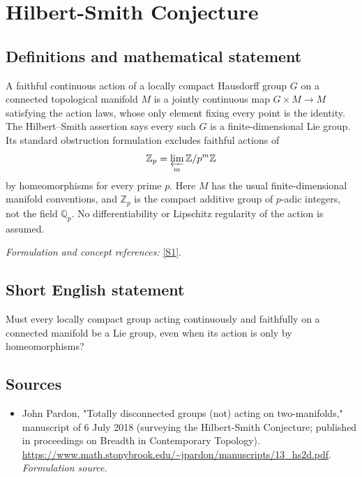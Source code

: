 \documentclass[11pt]{article}
\begin{document}
\section*{\texorpdfstring{Hilbert-Smith Conjecture}{Hilbert-Smith Conjecture}}\label{207}
\subsection{Definitions and mathematical statement}
A faithful continuous action of a locally compact Hausdorff group $G$ on a connected topological manifold $M$ is a jointly continuous map $G\times M\to M$ satisfying the action laws, whose only element fixing every point is the identity. The Hilbert--Smith assertion says every such $G$ is a finite-dimensional Lie group. Its standard obstruction formulation excludes faithful actions of
\[
 {\mathbb{Z}}_p=\varprojlim_m{\mathbb{Z}}/p^m{\mathbb{Z}}
\]
by homeomorphisms for every prime $p$. Here $M$ has the usual finite-dimensional manifold conventions, and ${\mathbb{Z}}_p$ is the compact additive group of $p$-adic integers, not the field ${\mathbb{Q}}_p$. No differentiability or Lipschitz regularity of the action is assumed.
\par\smallskip\textit{Formulation and concept references:} \href{https://www.math.stonybrook.edu/~jpardon/manuscripts/13_hs2d.pdf}{[S1]}.

\subsection{Short English statement}
Must every locally compact group acting continuously and faithfully on a connected manifold be a Lie group, even when its action is only by homeomorphisms?
\subsection{Sources}
\begin{itemize}
\item[S1]John Pardon, "Totally disconnected groups (not) acting on two-manifolds," manuscript of 6 July 2018 (surveying the Hilbert-Smith Conjecture; published in proceedings on Breadth in Contemporary Topology).
\url{https://www.math.stonybrook.edu/~jpardon/manuscripts/13_hs2d.pdf}.
\textit{Formulation source.}
\end{itemize}
\end{document}
